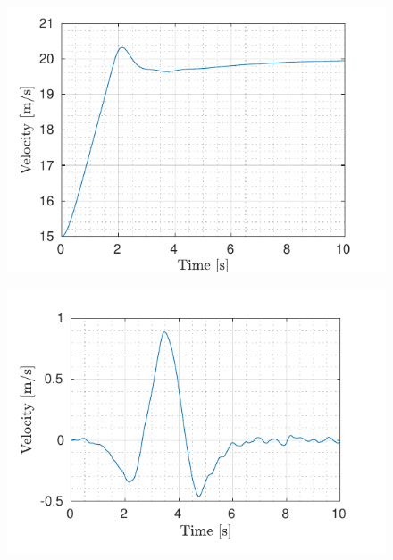 \begin{figure}[!h]
	\begin{minipage}[t]{0.5\textwidth}
		\includegraphics[width=\textwidth]{../../MATLAB/lane_following_curve/figure/LongitudinalVelocityVsTime_curve.pdf}
		\label{fig:longitudinal_velocity_laneFollowing_curve}
	\end{minipage}
	\begin{minipage}[t]{0.5\textwidth}
		\includegraphics[width=\textwidth]{../../MATLAB/lane_following_curve/figure/LateralVelocityVsTime_curve.pdf}
		\label{fig:lateral_velocity_laneFollowing_curve}
	\end{minipage}
	\begin{minipage}[t]{0.5\textwidth}

\end{minipage}
\end{figure}
